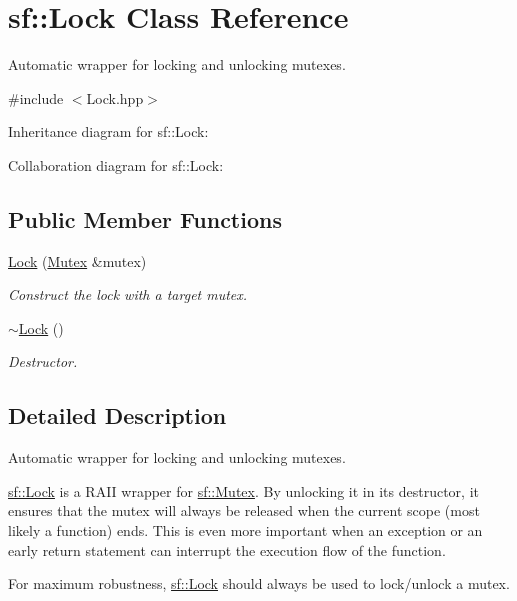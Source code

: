 \hypertarget{classsf_1_1_lock}{}\section{sf\+:\+:Lock Class Reference}
\label{classsf_1_1_lock}


Automatic wrapper for locking and unlocking mutexes.  




{\ttfamily \#include $<$Lock.\+hpp$>$}



Inheritance diagram for sf\+:\+:Lock\+:


Collaboration diagram for sf\+:\+:Lock\+:
\subsection*{Public Member Functions}
\begin{DoxyCompactItemize}
\item 
\hyperlink{classsf_1_1_lock_a1a4c5d7a15da61103d85c9aa7f118920}{Lock} (\hyperlink{classsf_1_1_mutex}{Mutex} \&mutex)
\begin{DoxyCompactList}\small\item\em Construct the lock with a target mutex. \end{DoxyCompactList}\item 
\hyperlink{classsf_1_1_lock_a8168b36323a18ccf5b6bc531d964aec5}{$\sim$\+Lock} ()
\begin{DoxyCompactList}\small\item\em Destructor. \end{DoxyCompactList}\end{DoxyCompactItemize}


\subsection{Detailed Description}
Automatic wrapper for locking and unlocking mutexes. 

\hyperlink{classsf_1_1_lock}{sf\+::\+Lock} is a R\+A\+II wrapper for \hyperlink{classsf_1_1_mutex}{sf\+::\+Mutex}. By unlocking it in its destructor, it ensures that the mutex will always be released when the current scope (most likely a function) ends. This is even more important when an exception or an early return statement can interrupt the execution flow of the function.

For maximum robustness, \hyperlink{classsf_1_1_lock}{sf\+::\+Lock} should always be used to lock/unlock a mutex.

